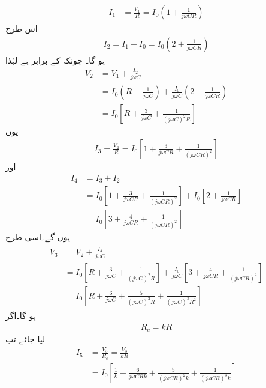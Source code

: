 \begin{align*}
I_1 &=\frac{V_1}{R}=I_0 \left (1+\frac{1}{j \omega C R} \right)
\end{align*}
اس طرح
\begin{align*}
I_2 =I_1+I_0=I_0 \left (2+\frac{1}{j \omega C R} \right)
\end{align*}
ہو گا۔ چونکہ  کے برابر ہے لہٰذا
\begin{align*}
V_2 &=V_1+\frac{I_2}{j \omega C} \\
&=I_0 \left (R+\frac{1}{j \omega C} \right )+\frac{I_0}{j \omega C} \left (2+\frac{1}{j \omega C R} \right )\\
&=I_0 \left [R+\frac{3}{j \omega C} +\frac{1}{\left(j \omega C \right )^2 R}\right ]
\end{align*}
یوں
\begin{align*}
I_3=\frac{V_2}{R}=I_0 \left [1+\frac{3}{j \omega C R}+\frac{1}{\left(j \omega C R \right )^2} \right ]
\end{align*}
اور
\begin{align*}
I_4 &=I_3 +I_2\\
&=I_0 \left [1+\frac{3}{j \omega C R}+\frac{1}{\left(j \omega C R \right )^2} \right ]+I_0 \left [2+\frac{1}{j \omega C R} \right] \\
&=I_0 \left[3+\frac{4}{j \omega C R}+\frac{1}{\left (j \omega C R \right )^2} \right]
\end{align*}
ہوں گے۔اسی طرح
\begin{gather}
\begin{aligned} \label{مساوات_مزاحمت_کپیسٹر_دباو_تین}
V_3 &=V_2 +\frac{I_4}{j \omega C} \\
&=I_0 \left [R+\frac{3}{j \omega C} +\frac{1}{\left(j \omega C \right )^2 R}\right ]+ \frac{I_0}{j \omega C} \left[3+\frac{4}{j \omega C R}+\frac{1}{\left (j \omega C R \right )^2} \right] \\
&=I_0 \left[R+\frac{6}{j \omega C}+\frac{5}{\left(j \omega C \right )^2 R} +\frac{1}{\left(j \omega C \right )^3 R^2}\right]
\end{aligned}
\end{gather}
ہو گا۔اگر
\begin{align}
R_c = k R
\end{align}
لیا جائے تب
\begin{align*}
I_5 &= \frac{V_3}{R_c} =\frac{V_3}{k R}\\ 
&= I_0 \left[\frac{1}{k}+\frac{6}{j \omega C R k}+\frac{5}{\left(j \omega C  R\right )^2 k} +\frac{1}{\left(j \omega C  R\right )^3 k}\right]
\end{align*}
